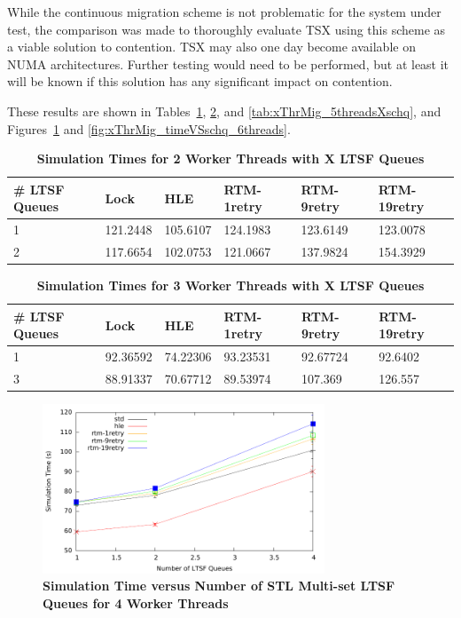 \documentclass[11pt]{book}
\begin{document}
While the continuous migration scheme is not problematic for the system under test, the
comparison was made to thoroughly evaluate TSX using this scheme as a viable solution to
contention.  TSX may also one day become available on NUMA architectures.  Further testing
would need to be performed, but at least it will be known if this solution has any
significant impact on contention.  

These results are shown in
Tables~\ref{tab:xThrMig_2threadsXschq}, \ref{tab:xThrMig_3threadsXschq}, and
\ref{tab:xThrMig_5threadsXschq}, and Figures~\ref{fig:xThrMig_timeVSschq_4threads} and
\ref{fig:xThrMig_timeVSschq_6threads}.

\begin{table}
    \centering
    \begin{tabular}{l|p{2cm}|p{2cm}|p{2cm}|p{2cm}|p{2cm}}
        \textbf{\# LTSF Queues}&Lock &HLE &RTM-1retry &RTM-9retry &RTM-19retry \\
        \hline
        \midrule
            1 &121.2448  &105.6107 &124.1983 &123.6149 &123.0078\\ 
            2 &117.6654  &102.0753 &121.0667 &137.9824 &154.3929\\
    \end{tabular}
    \caption{\textbf{Simulation Times for 2 Worker Threads with X LTSF
        Queues}}\label{tab:xThrMig_2threadsXschq} 
\end{table}

\begin{table}
    \centering
    \begin{tabular}{l|p{2cm}|p{2cm}|p{2cm}|p{2cm}|p{2cm}}
        \textbf{\# LTSF Queues}&Lock &HLE &RTM-1retry &RTM-9retry &RTM-19retry \\
        \hline
        \midrule
            1 &92.36592  &74.22306 &93.23531  &92.67724 &92.6402 \\ 
            3 &88.91337  &70.67712 &89.53974  &107.369  &126.557 \\
    \end{tabular}
    \caption{\textbf{Simulation Times for 3 Worker Threads with X LTSF
        Queues}}\label{tab:xThrMig_3threadsXschq} 
\end{table}

\begin{figure}
    \centering
    \graphicspath{ {./figures/} }
    \includegraphics[width=0.75\textwidth,keepaspectratio]{hugeepidemicsim-XEVENTmig-timeVSschedQs-multiset-4thread}
    \caption{\textbf{Simulation Time versus Number of STL Multi-set LTSF Queues for 4
        Worker Threads}}\label{fig:xThrMig_timeVSschq_4threads}
\end{figure}
\end{document}
